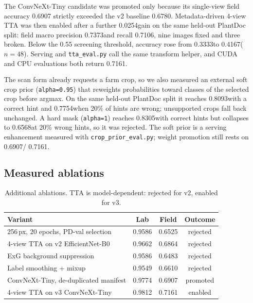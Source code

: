 \documentclass[journal,twocolumn,10pt]{IEEEtran}
\newcommand{\PDvtwo}{0.6780}
\newcommand{\ExGLab}{0.9586}
\newcommand{\ExGField}{0.6483}
\newcommand{\RegLab}{0.9549}
\newcommand{\RegField}{0.6610}
\newcommand{\PVvthreeSingle}{0.9774}
\newcommand{\PDvthreeSingle}{0.6907}
\newcommand{\PVvthree}{0.9812}
\newcommand{\PDvthree}{0.7161}
\newcommand{\PrecPDvthree}{0.7373}
\newcommand{\RecPDvthree}{0.7106}
\newcommand{\DeltaTTA}{0.0254}
\newcommand{\LowConfSingle}{0.3333}
\newcommand{\LowConfTTA}{0.4167}
\newcommand{\CropAlpha}{0.95}
\newcommand{\PDprior}{0.8093}
\newcommand{\PDpriorWrong}{0.7754}
\newcommand{\PDhard}{0.8305}
\newcommand{\PDhardWrong}{0.6568}
\begin{document}
The ConvNeXt-Tiny candidate was promoted only because its single-view field accuracy \PDvthreeSingle
strictly exceeded the v2 baseline \PDvtwo. Metadata-driven 4-view TTA was then enabled after a
further \DeltaTTA gain on the same held-out PlantDoc split: field macro precision \PrecPDvthree and
recall \RecPDvthree, nine images fixed and three broken. Below the 0.55 screening threshold,
accuracy rose from \LowConfSingle to \LowConfTTA ($n=48$). Serving and \texttt{tta\_eval.py} call
the same transform helper, and CUDA and CPU evaluations both return \PDvthree.

The scan form already requests a farm crop, so we also measured an external soft crop prior
(\texttt{alpha=\CropAlpha}) that reweights probabilities toward classes of the selected crop before
argmax. On the same held-out PlantDoc split it reaches \PDprior with a correct hint and
\PDpriorWrong when 20\% of hints are wrong; unsupported crops fall back unchanged. A hard mask
(\texttt{alpha=1}) reaches \PDhard with correct hints but collapses to \PDhardWrong at 20\% wrong
hints, so it was rejected. The soft prior is a serving enhancement measured with
\texttt{crop\_prior\_eval.py}; weight promotion still rests on \PDvthreeSingle / \PDvthree.

\subsection{Measured ablations}

\begin{table}[t]
\centering
\caption{Additional ablations. TTA is model-dependent: rejected for v2, enabled for v3.}
\label{tab:ablate}
\begin{tabular}{@{}lccc@{}}
\toprule
Variant & Lab & Field & Outcome \\
\midrule
256\,px, 20 epochs, PD-val selection & 0.9586 & 0.6525 & rejected \\
4-view TTA on v2 EfficientNet-B0 & 0.9662 & 0.6864 & rejected \\
ExG background suppression & \ExGLab & \ExGField & rejected \\
Label smoothing + mixup & \RegLab & \RegField & rejected \\
ConvNeXt-Tiny, de-duplicated manifest & \PVvthreeSingle & \PDvthreeSingle & promoted \\
4-view TTA on v3 ConvNeXt-Tiny & \PVvthree & \PDvthree & enabled \\
\bottomrule
\end{tabular}
\end{table}
\end{document}
